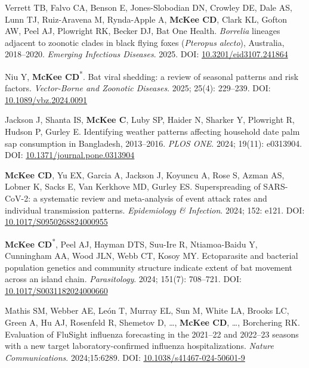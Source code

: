 \documentclass{cv}
\begin{document}
\begin{pubenum}

\item Verrett TB, Falvo CA, Benson E, Jones-Slobodian DN, Crowley DE, Dale AS, Lunn TJ, Ruiz-Aravena M, Rynda-Apple A, \textbf{McKee CD}, Clark KL, Gofton AW, Peel AJ, Plowright RK, Becker DJ, Bat One Health. \textit{Borrelia} lineages adjacent to zoonotic clades in black flying foxes (\textit{Pteropus alecto}), Australia, 2018–2020.  \textit{Emerging Infectious Diseases}. 2025. DOI: \href{https://doi.org/10.3201/eid3107.241864}{10.3201/eid3107.241864}

\item Niu Y\textsuperscript{\ddag}, \textbf{McKee CD}\textsuperscript{*}. Bat viral shedding: a review of seasonal patterns and risk factors. \textit{Vector-Borne and Zoonotic Diseases}. 2025; 25(4): 229--239. DOI: \href{https://doi.org/10.1089/vbz.2024.0091}{10.1089/vbz.2024.0091}

\item Jackson J\textsuperscript{\ddag}, Shanta IS, \textbf{McKee C}, Luby SP, Haider N, Sharker Y, Plowright R, Hudson P, Gurley E. Identifying weather patterns affecting household date palm sap consumption in Bangladesh, 2013--2016. \textit{PLOS ONE}. 2024; 19(11): e0313904. DOI: \href{https://doi.org/10.1371/journal.pone.0313904}{10.1371/journal.pone.0313904}

\item \textbf{McKee CD}, Yu EX, Garcia A\textsuperscript{\ddag}, Jackson J\textsuperscript{\ddag}, Koyuncu A, Rose S, Azman AS, Lobner K, Sacks E, Van Kerkhove MD, Gurley ES. Superspreading of SARS-CoV-2: a systematic review and meta-analysis of event attack rates and individual transmission patterns. \textit{Epidemiology \& Infection}. 2024; 152: e121. DOI: \href{https://doi.org/10.1017/S0950268824000955}{10.1017/S0950268824000955}

\item \textbf{McKee CD}\textsuperscript{*}, Peel AJ, Hayman DTS, Suu-Ire R, Ntiamoa-Baidu Y, Cunningham AA, Wood JLN, Webb CT, Kosoy MY. Ectoparasite and bacterial population genetics and community structure indicate extent of bat movement across an island chain. \textit{Parasitology}. 2024; 151(7): 708--721. DOI: \href{https://doi.org/10.1017/S0031182024000660}{10.1017/S0031182024000660}

\item Mathis SM, Webber AE, León T, Murray EL, Sun M, White LA, Brooks LC, Green A, Hu AJ, Rosenfeld R, Shemetov D, …, \textbf{McKee CD}, …, Borchering RK. Evaluation of FluSight influenza forecasting in the 2021--22 and 2022--23 seasons with a new target laboratory-confirmed influenza hospitalizations. \textit{Nature Communications}. 2024;15:6289. DOI: \href{https://doi.org/10.1038/s41467-024-50601-9}{10.1038/s41467-024-50601-9}


\end{pubenum}
\end{document}
